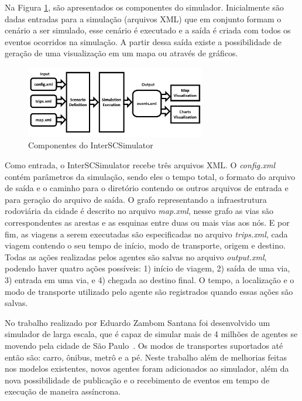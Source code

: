 Na Figura \ref{fig:simulator_components}, são apresentados os componentes do simulador.
Inicialmente são dadas entradas para a simulação (arquivos XML) que em conjunto formam o cenário a ser simulado, esse cenário é executado e a
saída é criada com todos os eventos ocorridos na simulação.
A partir dessa saída existe a possibilidade de geração de uma visualização em um mapa ou através de gráficos.

\begin{figure}[ht]
	\centering
	\includegraphics[width=0.7\textwidth]{figuras/Components.pdf}
	\caption{Componentes do InterSCSimulator}
	\label{fig:simulator_components}
\end{figure}

Como entrada, o InterSCSimulator recebe três arquivos XML.
O \textit{config.xml} contém parâmetros da simulação, sendo eles o tempo total, o formato do
arquivo de saída e o caminho para o diretório contendo os outros arquivos de entrada e para geração do arquivo de saída.
O grafo representando a infraestrutura rodoviária da cidade é descrito no arquivo \textit{map.xml}, nesse grafo as vias são correspondentes as arestas e as esquinas entre
duas ou mais vias aos nós.
E por fim, as viagens a serem executadas são especificadas no arquivo \textit{trips.xml}, cada viagem contendo o seu tempo de início, modo de transporte, origem e destino.
Todas as ações realizadas pelos agentes são salvas no arquivo \textit{output.xml}, podendo haver quatro ações possíveis: 1) início de viagem, 2) saída de uma via,
3) entrada em uma via, e 4) chegada ao destino final.
O tempo, a localização e o modo de transporte utilizado pelo agente são registrados quando essas ações são salvas.

No trabalho realizado por Eduardo Zambom Santana foi desenvolvido um simulador de larga escala, que é capaz de simular mais de 4 milhões de
agentes se movendo pela cidade de São Paulo~\cite{santana_17}.
Os modos de transportes suportados até então são: carro, ônibus, metrô e a pé.
Neste trabalho além de melhorias feitas nos modelos existentes, novos agentes foram adicionados ao simulador, além da nova possibilidade de publicação e o recebimento de
eventos em tempo de execução de maneira assíncrona.

